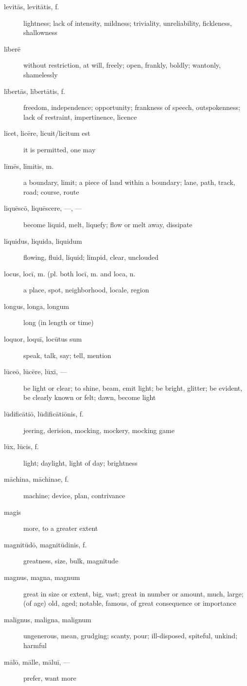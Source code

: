 \begin{description}
    \item[levitās, levitātis, f.] lightness; lack of intensity, mildness; triviality, unreliability, fickleness, shallowness
    \item[līberē] without restriction, at will, freely; open, frankly, boldly; wantonly, shamelessly
    \item[lībertās, lībertātis, f.] freedom, independence; opportunity; frankness of speech, outspokenness; lack of restraint, impertinence, licence
    \item[licet, licēre, licuit/licitum est] it is permitted, one may
    \item[līmēs, līmitis, m.] a boundary, limit; a piece of land within a boundary; lane, path, track, road; course, route
    \item[liquēscō, liquēscere, ---, ---] become liquid, melt, liquefy; flow or melt away, dissipate
    \item[liquidus, liquida, liquidum] flowing, fluid, liquid; limpid, clear, unclouded
    \item[locus, locī, m. (pl. both locī, m. and loca, n.] a place, spot, neighborhood, locale, region
    \item[longus, longa, longum] long (in length or time)
    \item[loquor, loquī, locūtus sum] speak, talk, say; tell, mention
    \item[lūceō, lūcēre, lūxī, ---] be light or clear; to shine, beam, emit light; be bright, glitter; be evident, be clearly known or felt; dawn, become light
    \item[lūdificātiō, lūdificātiōnis, f.] jeering, derision, mocking, mockery, mocking game
    \item[lūx, lūcis, f.] light; daylight, light of day; brightness
    \item[māchina, māchinae, f.] machine; device, plan, contrivance
    \item[magis] more, to a greater extent
    \item[magnitūdō, magnitūdinis, f.] greatness, size, bulk, magnitude
    \item[magnus, magna, magnum] great in size or extent, big, vast; great in number or amount, much, large; (of age) old, aged; notable, famous, of great consequence or importance
    \item[malignus, maligna, malignum] ungenerous, mean, grudging; scanty, pour; ill-disposed, spiteful, unkind; harmful
    \item[mālō, mālle, māluī, ---] prefer, want more

\end{description}
